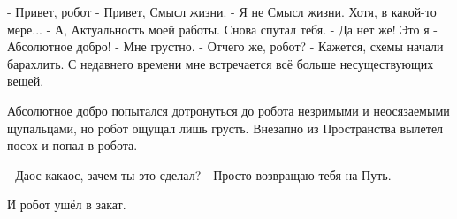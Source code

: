 - Привет, робот
- Привет, Смысл жизни.
- Я не Смысл жизни. Хотя, в какой-то мере...
- А, Актуальность моей работы. Снова спутал тебя.
- Да нет же! Это я - Абсолютное добро!
- Мне грустно.
- Отчего же, робот?
- Кажется, схемы начали барахлить. С недавнего времени мне встречается всё больше несуществующих вещей.

Абсолютное добро попытался дотронуться до робота незримыми и неосязаемыми щупальцами, но робот ощущал лишь грусть. Внезапно из Пространства вылетел посох и попал в робота.

- Даос-какаос, зачем ты это сделал?
- Просто возвращаю тебя на Путь.

И робот ушёл в закат.